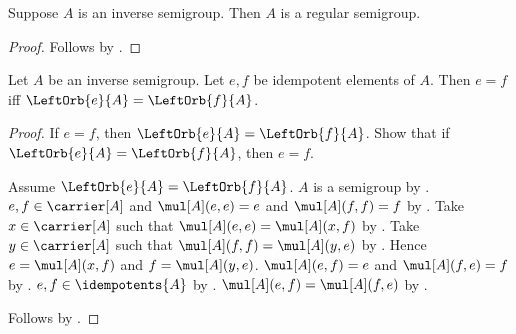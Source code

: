 \begin{proposition}\label{inversesemigroup_is_regularsemigroup}
    Suppose $A$ is an inverse semigroup.
    Then $A$ is a regular semigroup.
\end{proposition}
\begin{proof}
    Follows by .
\end{proof}

\begin{proposition}\label{idempotentelems_eq_iff_orbits_eq}
    Let $A$ be an inverse semigroup.
    Let $e,f$ be idempotent elements of $A$.
    Then $e=f$ iff $\LeftOrb{e}{A}=\LeftOrb{f}{A}$.
\end{proposition}
\begin{proof}
    If $e=f$, then $\LeftOrb{e}{A}=\LeftOrb{f}{A}$.
    Show that if $\LeftOrb{e}{A}=\LeftOrb{f}{A}$, then $e=f$.
    \begin{subproof}
        Assume $\LeftOrb{e}{A}=\LeftOrb{f}{A}$.
        $A$ is a semigroup by
            .
        $e,f\in\carrier[A]$ and
            $\mul[A](e,e)=e$ and $\mul[A](f,f)=f$ by
            .
        Take $x\in\carrier[A]$ such that
            $\mul[A](e,e)=\mul[A](x,f)$
            by .
        Take $y\in\carrier[A]$ such that
            $\mul[A](f,f)=\mul[A](y,e)$
            by .
        Hence $e=\mul[A](x,f)$ and $f=\mul[A](y,e)$.
        $\mul[A](e,f)=e$ and $\mul[A](f,e)=f$
            by .
        $e,f\in\idempotents{A}$ by
            .
        $\mul[A](e,f)=\mul[A](f,e)$
            by .
    \end{subproof}
    Follows by \auto.
\end{proof}
